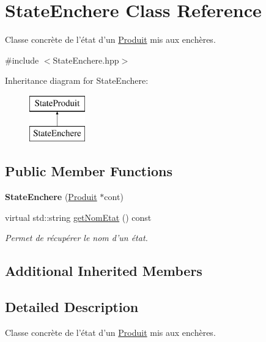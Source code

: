 \hypertarget{classStateEnchere}{\section{State\-Enchere Class Reference}
\label{classStateEnchere}
}


Classe concrète de l'état d'un \hyperlink{classProduit}{Produit} mis aux enchères.  




{\ttfamily \#include $<$State\-Enchere.\-hpp$>$}

Inheritance diagram for State\-Enchere\-:\begin{figure}[H]
\begin{center}
\leavevmode
\includegraphics[height=2.000000cm]{classStateEnchere}
\end{center}
\end{figure}
\subsection*{Public Member Functions}
\begin{DoxyCompactItemize}
\item 
\hypertarget{classStateEnchere_a8038385efd919bfdf6a3da9c96c99368}{{\bfseries State\-Enchere} (\hyperlink{classProduit}{Produit} $\ast$cont)}\label{classStateEnchere_a8038385efd919bfdf6a3da9c96c99368}

\item 
virtual std\-::string \hyperlink{classStateEnchere_a2c6ccc2c404381333ed64488568d34aa}{get\-Nom\-Etat} () const 
\begin{DoxyCompactList}\small\item\em Permet de récupérer le nom d'un état. \end{DoxyCompactList}\end{DoxyCompactItemize}
\subsection*{Additional Inherited Members}


\subsection{Detailed Description}
Classe concrète de l'état d'un \hyperlink{classProduit}{Produit} mis aux enchères. 

